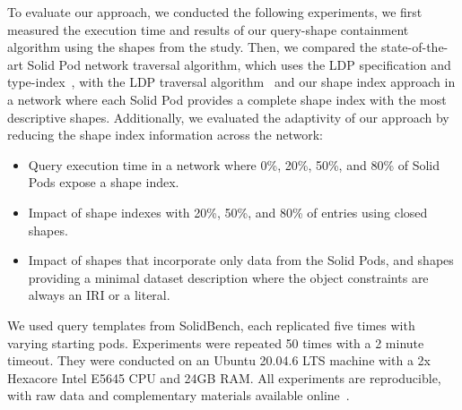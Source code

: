 To evaluate our approach, we conducted the following experiments, we first measured the execution time and results of our query-shape containment algorithm using the shapes from the study.
Then, we compared the state-of-the-art Solid Pod network traversal algorithm, which uses the LDP specification and type-index~\cite{Taelman2023}, with the LDP traversal algorithm~\cite{Taelman2023} and our shape index approach in a network where each Solid Pod provides a complete shape index with the most descriptive  shapes.
Additionally, we evaluated the adaptivity  of our approach by reducing the shape index information across the network:
\begin{itemize}
   \item Query execution time in a network where 0\%, 20\%, 50\%, and 80\% of Solid Pods expose a shape index. 
   \item Impact of shape indexes with 20\%, 50\%, and 80\% of entries using closed shapes.
   \item Impact of shapes that incorporate only data from the Solid Pods, and shapes providing a minimal dataset description where the object constraints are always an IRI or a literal.
\end{itemize}
We used query templates from SolidBench, each replicated five times with varying starting pods.
Experiments were repeated 50 times with a 2 minute timeout. 
They were conducted on an Ubuntu 20.04.6 LTS machine with a 2x Hexacore Intel E5645 CPU and 24GB RAM.
All experiments are reproducible, with raw data and complementary materials available online~.


